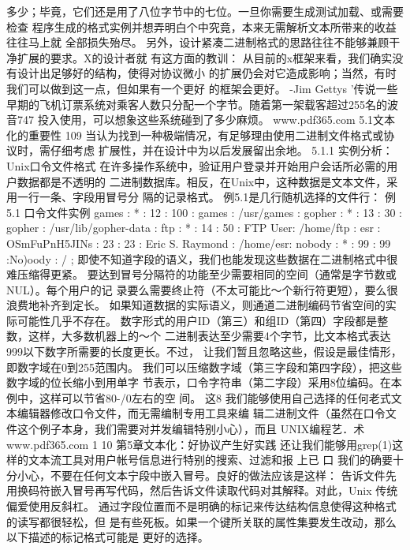 \documentclass[11pt,oneside]{book}
\begin{document}
\begin{common-format}
多少；毕竟，它们还是用了八位字节中的七位。一旦你需要生成测试加载、或需要检查
程序生成的格式实例并想弄明白个中究竟，本来无需解析文本所带来的收益往往马上就
全部损失殆尽。
    另外，设计紧凑二进制格式的思路往往不能够兼顾干净扩展的要求。X的设计者就
有这方面的教训：
    从目前的x框架来看，我们确实没有设计出足够好的结构，使得对协议微小
的扩展仍会对它造成影响；当然，有时我们可以做到这一点，但如果有一个更好
的框架会更好。
-Jim Gettys
’传说一些早期的飞机订票系统对乘客人数只分配一个字节。随着第一架载客超过255名的波音747
投入使用，可以想象这些系统碰到了多少麻烦。
www.pdf365.com
5.1文本化的重要性
109
    当认为找到一种极端情况，有足够理由使用二进制文件格式或协议时，需仔细考虑
扩展性，并在设计中为以后发展留出余地。
5.1.1  实例分析：Unix口令文件格式
    在许多操作系统中，验证用户登录并开始用户会话所必需的用户数据都是不透明的
二进制数据库。相反，在Unix中，这种数据是文本文件，采用一行一条、字段用冒号分
隔的记录格式。
    例5.1是几行随机选择的文件行：
例5.1  口令文件实例
games : * : 12 : 100 : games : /usr/games :
gopher : * : 13 : 30 : gopher : /usr/lib/gopher-data :
ftp : * : 14 : 50 : FTP  User: /home/ftp :
esr : OSmFuPnH5JINs : 23 : 23 : Eric  S.  Raymond : /home/esr:
nobody : * : 99 : 99 :No)oody : / ;
    即使不知道字段的语义，我们也能发现这些数据在二进制格式中很难压缩得更紧。
要达到冒号分隔符的功能至少需要相同的空间（通常是字节数或NUL）。每个用户的记
录要么需要终止符（不太可能比～个新行符更短），要么很浪费地补齐到定长。
    如果知道数据的实际语义，则通道二进制编码节省空间的实际可能性几乎不存在。
数字形式的用户ID（第三）和组ID（第四）字段都是整数，这样，大多数机器上的～个
二进制表达至少需要4个字节，比文本格式表达999以下数字所需要的长度更长。不过，
让我们暂且忽略这些，假设是最佳情形，即数字域在0到255范围内。
    我们可以压缩数字域（第三字段和第四字段），把这些数字域的位长缩小到用单字
节表示，口令字符串（第二字段）采用8位编码。在本例中，这样可以节省80-/0左右的空
间。
    这8%
我们能够使用自己选择的任何老式文本编辑器修改口令文件，而无需编制专用工具来编
辑二进制文件（虽然在口令文件这个例子本身，我们需要对并发编辑特别小心），而且
UNIX编程艺．术
  www.pdf365.com
1 10
第5章文本化：好协议产生好实践
还让我们能够用grep(1)这样的文本流工具对用户帐号信息进行特别的搜索、过滤和报
上已
口
    我们的确要十分小心，不要在任何文本宁段中嵌入冒号。良好的做法应该是这样：
告诉文件先用换码符嵌入冒号再写代码，然后告诉文件读取代码对其解释。对此，Unix
传统偏爱使用反斜杠。
    通过字段位置而不是明确的标记来传达结构信息使得这种格式的读写都很轻松，但
是有些死板。如果一个键所关联的属性集要发生改动，那么以下描述的标记格式可能是
更好的选择。

\end{common-format}
\end{document}
